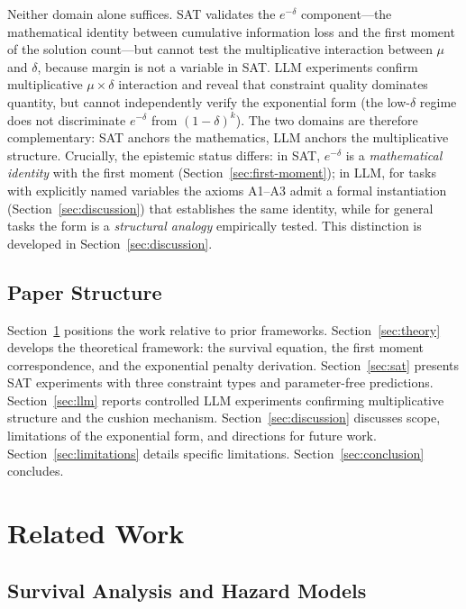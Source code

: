 \documentclass[11pt,a4paper]{article}
\begin{document}
Neither domain alone suffices. SAT validates the $e^{-\delta}$ component---the mathematical identity between cumulative information loss and the first moment of the solution count---but cannot test the multiplicative interaction between $\mu$ and $\delta$, because margin is not a variable in SAT. LLM experiments confirm multiplicative $\mu \times \delta$ interaction and reveal that constraint quality dominates quantity, but cannot independently verify the exponential form (the low-$\delta$ regime does not discriminate $e^{-\delta}$ from $(1-\delta)^k$). The two domains are therefore complementary: SAT anchors the mathematics, LLM anchors the multiplicative structure. Crucially, the epistemic status differs: in SAT, $e^{-\delta}$ is a \emph{mathematical identity} with the first moment (Section~\ref{sec:first-moment}); in LLM, for tasks with explicitly named variables the axioms A1--A3 admit a formal instantiation (Section~\ref{sec:discussion}) that establishes the same identity, while for general tasks the form is a \emph{structural analogy} empirically tested. This distinction is developed in Section~\ref{sec:discussion}.

\subsection{Paper Structure}

Section~\ref{sec:related} positions the work relative to prior frameworks. Section~\ref{sec:theory} develops the theoretical framework: the survival equation, the first moment correspondence, and the exponential penalty derivation. Section~\ref{sec:sat} presents SAT experiments with three constraint types and parameter-free predictions. Section~\ref{sec:llm} reports controlled LLM experiments confirming multiplicative structure and the cushion mechanism. Section~\ref{sec:discussion} discusses scope, limitations of the exponential form, and directions for future work. Section~\ref{sec:limitations} details specific limitations. Section~\ref{sec:conclusion} concludes.

\section{Related Work}
\label{sec:related}

\subsection{Survival Analysis and Hazard Models}
\end{document}
